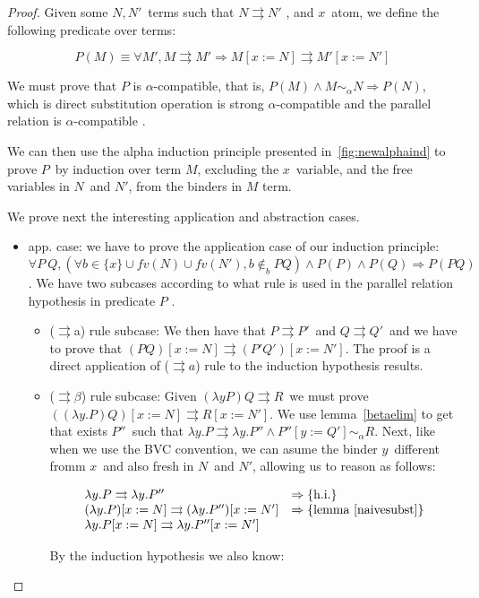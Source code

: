 \documentclass[preprint,10pt]{sigplanconf}
\newcommand{\alp}{\ensuremath{\alpha}}
\newcommand{\lam}{\ensuremath{\lambda}}
\newcommand{\alpsym}{\ensuremath{\sim_\alpha}}
\newcommand{\p}{\ensuremath{\rightrightarrows}}
\newcommand{\ninb}{\ensuremath{\not\in_b}}
\begin{document}
\begin{proof}
Given some $N,N'$\ terms such that $N \p N'$ , and $x$\ atom, we define the following predicate over terms:

\[ P(M) \equiv \forall M', M \p M' \Rightarrow M [ x := N ] \p M' [ x := N' ] \]

We must prove that $P$ is \alp-compatible, that is,  $P(M) \wedge M \alpsym N \Rightarrow P(N)$, which is direct substitution operation is strong \alp-compatible and the parallel relation is \alp-compatible .
  
We can then use the alpha induction principle presented in~\ref{fig:newalphaind} to prove $P$\ by induction over term $M$, excluding the $x$\ variable, and the free variables in $N$\ and $N'$, from the binders in $M$ term. 

We prove next the interesting application and abstraction cases. 

\begin{itemize}
\item app. case: we have to prove the application case of our induction principle: $\forall P\ Q, (\forall b \in \{x \} \cup fv(N) \cup fv(N'), b \ninb P Q) \wedge P(P) \wedge P(Q)  \Rightarrow P (P Q)$. We have two subcases according to what rule is used in the parallel relation hypothesis in predicate $P$ .
  \begin{itemize}
  \item (\p a) rule subcase: We then have that $P \p P'$\ and $Q \p Q'$\ and we have to prove that $(P Q) [x := N ] \p (P' Q') [x := N']$. The proof is a direct application of ($\p a$) rule to the induction hypothesis results.
  \item (\p$\beta$) rule subcase: Given $(\lam y P) Q \p R$\ we must prove $((\lam y. P) Q) [x := N ] \p R [x := N']$. We use lemma~\ref{betaelim} to get that exists $P''$\ such that $\lam y .P \p \lam y. P'' \wedge P''[y:=Q'] \alpsym R$. Next, like when we use the BVC convention, we can asume the binder $y$\ different fromm $x$\ and also fresh in $N$\ and $N'$, allowing us to reason as follows:

\[
\begin{array}{ll}
  \lam y. P \p \lam y. P'' & \Rightarrow \{\text{h.i.}\}\\
  (\lam y. P)[x:=N] \p (\lam y. P'')[x:=N'] & \Rightarrow \{\text{lemma~\ref{naivesubst}}\}\\
  \lam y .P[x:=N] \p \lam y . P''[x:=N'] & 
\end{array}
\]

By the induction hypothesis we also know:


\end{itemize}
\end{itemize}
\end{proof}
\end{document}
